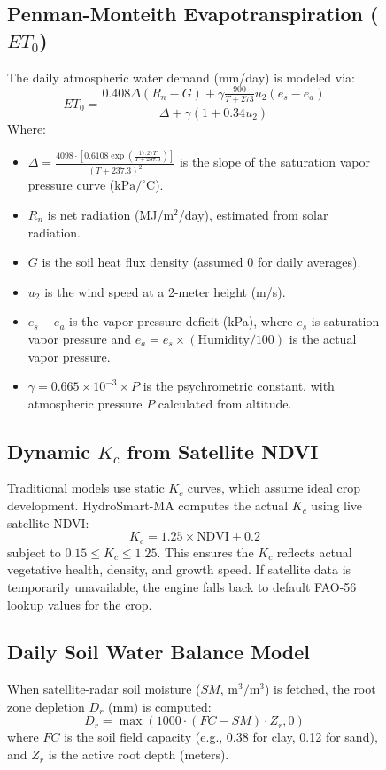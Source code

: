 \documentclass[3p,twocolumn]{elsarticle}
\begin{document}
\begin{figure}[t]
\subsection{Penman-Monteith Evapotranspiration ($ET_0$)}
The daily atmospheric water demand (mm/day) is modeled via:
\begin{equation}
ET_0 = \frac{0.408 \Delta (R_n - G) + \gamma \frac{900}{T + 273} u_2 (e_s - e_a)}{\Delta + \gamma (1 + 0.34 u_2)}
\end{equation}
Where:
\begin{itemize}
    \item $\Delta = \frac{4098 \cdot [0.6108 \exp(\frac{17.27 T}{T + 237.3})]}{(T + 237.3)^2}$ is the slope of the saturation vapor pressure curve ($\text{kPa}/^\circ\text{C}$).
    \item $R_n$ is net radiation (MJ/$\text{m}^2$/day), estimated from solar radiation.
    \item $G$ is the soil heat flux density (assumed $0$ for daily averages).
    \item $u_2$ is the wind speed at a 2-meter height (m/s).
    \item $e_s - e_a$ is the vapor pressure deficit (kPa), where $e_s$ is saturation vapor pressure and $e_a = e_s \times (\text{Humidity} / 100)$ is the actual vapor pressure.
    \item $\gamma = 0.665 \times 10^{-3} \times P$ is the psychrometric constant, with atmospheric pressure $P$ calculated from altitude.
\end{itemize}

\subsection{Dynamic $K_c$ from Satellite NDVI}
Traditional models use static $K_c$ curves, which assume ideal crop development. HydroSmart-MA computes the actual $K_c$ using live satellite NDVI:
\begin{equation}
K_c = 1.25 \times \text{NDVI} + 0.2
\end{equation}
subject to $0.15 \le K_c \le 1.25$. This ensures the $K_c$ reflects actual vegetative health, density, and growth speed. If satellite data is temporarily unavailable, the engine falls back to default FAO-56 lookup values for the crop.

\subsection{Daily Soil Water Balance Model}
When satellite-radar soil moisture ($SM$, $\text{m}^3/\text{m}^3$) is fetched, the root zone depletion $D_r$ (mm) is computed:
\begin{equation}
D_r = \max(1000 \cdot (FC - SM) \cdot Z_r, 0)
\end{equation}
where $FC$ is the soil field capacity (e.g., 0.38 for clay, 0.12 for sand), and $Z_r$ is the active root depth (meters). 


\end{figure}
\end{document}
